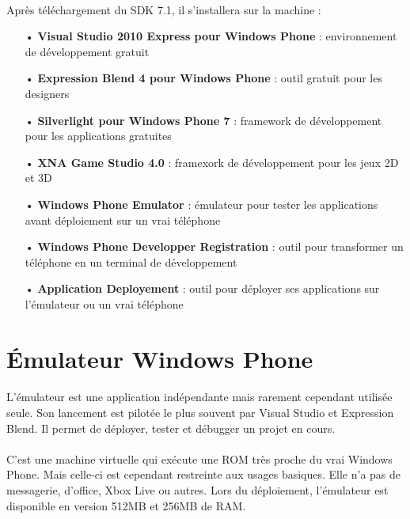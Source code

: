 \documentclass[twoside,UTF8]{EPURapport}
\begin{document}
\paragraph{}
Après téléchargement du SDK 7.1, il s'installera sur la machine : 
\begin{itemize}
	\item[•]\textbf{Visual Studio 2010 Express pour Windows Phone} : environnement de développement gratuit
	\item[•]\textbf{Expression Blend 4 pour Windows Phone} : outil gratuit pour les designers
	\item[•]\textbf{Silverlight pour Windows Phone 7} : framework de développement pour les applications gratuites
	\item[•]\textbf{XNA Game Studio 4.0} : framexork de développement pour les jeux 2D et 3D
	\item[•]\textbf{Windows Phone Emulator} : émulateur pour tester les applications avant déploiement sur un vrai téléphone
	\item[•]\textbf{Windows Phone Developper Registration} : outil pour transformer un téléphone en un terminal de développement
	\item[•]\textbf{Application Deployement} : outil pour déployer ses applications sur l'émulateur ou un vrai téléphone
\end{itemize}
	
	\section{\'Emulateur Windows Phone}
\paragraph{}
L'émulateur est une application indépendante mais rarement cependant utilisée seule. Son lancement est pilotée le plus souvent par Visual Studio et Expression Blend. Il permet de déployer, tester et débugger un projet en cours. 

\paragraph{}
C'est une machine virtuelle qui exécute une ROM très proche du vrai Windows Phone. Mais celle-ci est cependant restreinte aux usages basiques. Elle n'a pas de messagerie, d'office, Xbox Live ou autres. Lors du déploiement, l'émulateur est disponible en version 512MB et 256MB de RAM. 
\end{document}
